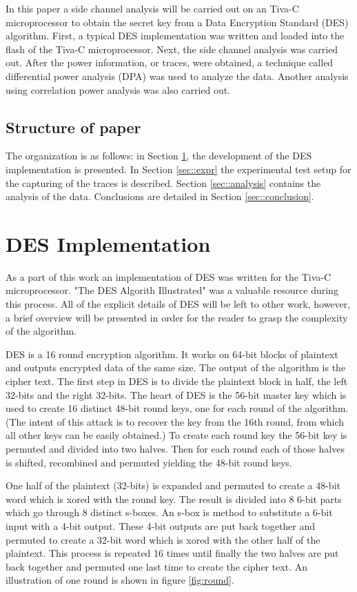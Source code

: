 	In this paper a side channel analysis will be carried out on an Tiva-C  microprocessor to obtain the secret key from a Data Encryption Standard (DES) algorithm.  First, a typical DES implementation was written and loaded into the flash of the Tiva-C microprocessor.  Next, the side channel analysis was carried out.  After the power information, or traces, were obtained, a technique called differential power analysis (DPA) was used to analyze the data.  Another analysis using correlation power analysis was also carried out.  \cite{des} \cite{Messerges}


\subsection{Structure of paper}
	The organization is as follows: in Section \ref{sec::des_impl}, the development of the DES implementation is presented.  In Section \ref{sec::expr} the experimental test setup for the capturing of the traces is described. Section \ref{sec::analysis} contains the analysis of the data.  Conclusions are detailed in Section \ref{sec::conclusion}. 


\section{DES Implementation} \label{sec::des_impl}
	As a part of this work an implementation of DES was written for the Tiva-C microprocessor.  "The DES Algorith Illustrated" was a valuable resource during this process.  All of the explicit details of DES will be left to other work, however, a brief overview will be presented in order for the reader to grasp the complexity of the algorithm. \cite{des}

	DES is a 16 round encryption algorithm.  It works on 64-bit blocks of plaintext and outputs encrypted data of the same size.  The output of the algorithm is the cipher text.  The first step in DES is to divide the plaintext block in half, the left 32-bits and the right 32-bits.  The heart of DES is the 56-bit master key which is used to create 16 distinct 48-bit round keys, one for each round of the algorithm.  (The intent of this attack is to recover the key from the 16th round, from which all other keys can be easily obtained.)  To create each round key the 56-bit key is permuted and divided into two halves.  Then for each round each of those halves is shifted, recombined and permuted yielding the 48-bit round keys.

	One half of the plaintext (32-bits) is expanded and permuted to create a 48-bit word which is xored with the round key.  The result is divided into 8 6-bit parts which go through 8 distinct s-boxes.  An s-box is  method to substitute a 6-bit input with a 4-bit output.  These 4-bit outputs are put back together and permuted to create a 32-bit word which is xored with the other half of the plaintext.  This process is repeated 16 times until finally the two halves are put back together and permuted one last time to create the cipher text.  An illustration of one round is shown in figure \ref{fig:round}.

